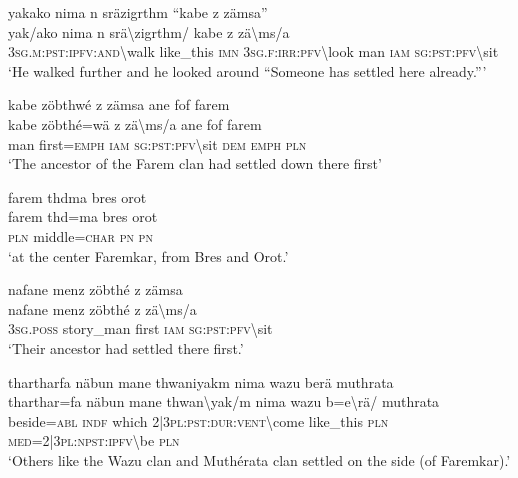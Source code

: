 \ea\label{ex:2:a1635}
yakako nima n sräzigrthm ``kabe z zämsa''\\
\gll {\textbackslash}yak/ako	nima	n	srä{\textbackslash}zigrthm/	kabe	z	zä{\textbackslash}ms/a\\
     3\textsc{sg}.\textsc{m}:\textsc{pst}:\textsc{ipfv}:\textsc{and}{\textbackslash}walk	like\_this	\textsc{imn}	3\textsc{sg}.\textsc{f}:\textsc{irr}:\textsc{pfv}{\textbackslash}look	man	\textsc{iam}	\textsc{sg}:\textsc{pst}:\textsc{pfv}{\textbackslash}sit\\
\glt `He walked further and he looked around ``Someone has settled here already.'''
\z

\ea\label{ex:2:a1636}
kabe zöbthwé z zämsa ane fof farem\\
\gll kabe	zöbthé=wä	z	zä{\textbackslash}ms/a	ane	fof	farem\\
     man	first=\textsc{emph}	\textsc{iam}	\textsc{sg}:\textsc{pst}:\textsc{pfv}{\textbackslash}sit	\textsc{dem}	\textsc{emph}	\textsc{pln}\\
\glt `The ancestor of the Farem clan had settled down there first'
\z

\ea\label{ex:2:a1637}
farem thdma bres orot\\
\gll farem	thd=ma	bres	orot\\
     \textsc{pln}	middle=\textsc{char}	\textsc{pn}	\textsc{pn}\\
\glt `at the center Faremkar, from Bres and Orot.'
\z

\ea\label{ex:2:a1639}
nafane menz zöbthé z zämsa\\
\gll nafane	menz	zöbthé	z	zä{\textbackslash}ms/a\\
     3\textsc{sg}.\textsc{poss}	story\_man	first	\textsc{iam}	\textsc{sg}:\textsc{pst}:\textsc{pfv}{\textbackslash}sit\\
\glt `Their ancestor had settled there first.'
\z

\ea\label{ex:2:a1640}
thartharfa näbun mane thwaniyakm nima wazu berä muthrata\\
\gll tharthar=fa	näbun	mane	thwan{\textbackslash}yak/m	nima	wazu	b=e{\textbackslash}rä/	muthrata\\
     beside=\textsc{abl}	\textsc{indf}	which	2|3\textsc{pl}:\textsc{pst}:\textsc{dur}:\textsc{vent}{\textbackslash}come	like\_this	\textsc{pln}	\textsc{med}=2|3\textsc{pl}:\textsc{npst}:\textsc{ipfv}{\textbackslash}be	\textsc{pln}\\
\glt `Others like the Wazu clan and Muthérata clan settled on the side (of Faremkar).'
\z

